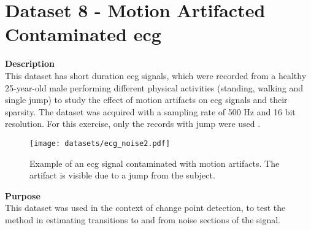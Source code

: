\section{Dataset 8 - Motion Artifacted Contaminated \gls{ecg}}
\label{dat:dataset8}
\textbf{Description}\hfill\\
This dataset has short duration \gls{ecg} signals, which were recorded from a healthy 25-year-old male performing different physical activities (standing, walking and single jump) to study the effect of motion artifacts on \gls{ecg} signals and their sparsity. The dataset was acquired with a sampling rate of 500 Hz and 16 bit resolution. For this exercise, only the records with jump were used \cite{dataset7, PhysioNet}.\\

\begin{figure}
\centering
\texttt{[image: datasets/ecg\_noise2.pdf]}
\caption{Example of an \gls{ecg} signal contaminated with motion artifacts. The artifact is visible due to a jump from the subject.}
\label{fig:ecg2_dataset}
\end{figure}

\textbf{Purpose}\hfill\\
This dataset was used in the context of change point detection, to test the method in estimating transitions to and from noise sections of the signal.

%
%

